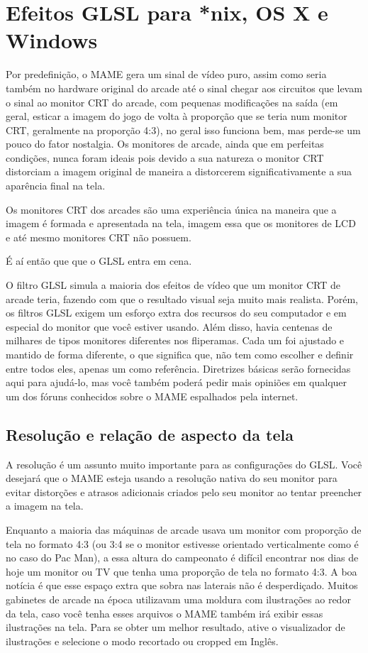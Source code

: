 \documentclass[letterpaper,10pt,brazil]{sphinxmanual}
\begin{document}
\section{Efeitos GLSL para *nix, OS X e Windows}
\label{advanced/glsl::doc}\label{advanced/glsl:efeitos-glsl-para-nix-os-x-e-windows}
Por predefinição, o MAME gera um sinal de vídeo puro, assim como seria
também no hardware original do arcade até o sinal chegar aos circuitos
que levam o sinal ao monitor CRT do arcade, com pequenas modificações na
saída (em geral, esticar a imagem do jogo de volta à proporção que se
teria num monitor CRT, geralmente na proporção 4:3), no geral isso
funciona bem, mas perde-se um pouco do fator nostalgia. Os monitores de
arcade, ainda que em perfeitas condições, nunca foram ideais pois devido
a sua natureza o monitor CRT distorciam a imagem original de maneira
a distorcerem significativamente a sua aparência final na tela.

Os monitores CRT dos arcades são uma experiência única na maneira que a
imagem é formada e apresentada na tela, imagem essa que os monitores de
LCD e até mesmo monitores CRT não possuem.

É aí então que que o GLSL entra em cena.

O filtro GLSL simula a maioria dos efeitos de vídeo que um monitor CRT
de arcade teria, fazendo com que o resultado visual seja muito mais
realista. Porém, os filtros GLSL exigem um esforço extra dos recursos do
seu computador e em especial do monitor que você estiver usando.
Além disso, havia centenas de milhares de tipos monitores diferentes nos
fliperamas. Cada um foi ajustado e mantido de forma diferente, o que
significa que, não tem como escolher e definir entre todos eles, apenas
um como referência. Diretrizes básicas serão fornecidas aqui para
ajudá-lo, mas você também poderá pedir mais opiniões em qualquer um dos
fóruns conhecidos sobre o MAME espalhados pela internet.


\subsection{Resolução e relação de aspecto da tela}
\label{advanced/glsl:resolucao-e-relacao-de-aspecto-da-tela}
A resolução é um assunto muito importante para as configurações do GLSL.
Você desejará que o MAME esteja usando a resolução nativa do seu monitor
para evitar distorções e atrasos adicionais criados pelo seu monitor ao
tentar preencher a imagem na tela.

Enquanto a maioria das máquinas de arcade usava um monitor com proporção
de tela no formato 4:3 (ou 3:4 se o monitor estivesse orientado
verticalmente como é no caso do Pac Man), a essa altura do campeonato é
difícil encontrar nos dias de hoje um monitor ou TV que tenha uma
proporção de tela no formato 4:3. A boa notícia é que esse espaço extra
que sobra nas laterais não é desperdiçado. Muitos gabinetes de arcade na
época utilizavam uma moldura com ilustrações ao redor da tela, caso você
tenha esses arquivos o MAME também irá exibir essas ilustrações na tela.
Para se obter um melhor resultado, ative o visualizador de ilustrações e
selecione o modo recortado ou cropped em Inglês.
\end{document}
